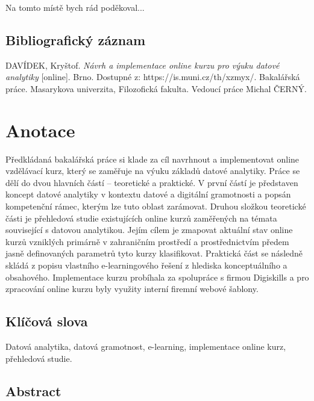 \documentclass[a4paper,12pt,openany,twoside]{book} %
\begin{document}
\par
\par\vspace*{\fill}

Na tomto místě bych rád poděkoval...

\clearpage

\subsection*{Bibliografický záznam}

DAVÍDEK, Kryštof. \textit{Návrh a implementace online kurzu pro výuku datové analytiky} [online]. Brno. Dostupné z: https://is.muni.cz/th/xzmyx/. Bakalářská práce. Masarykova univerzita, Filozofická fakulta. Vedoucí práce Michal ČERNÝ.

\section*{Anotace}

Předkládaná bakalářská práce si klade za cíl navrhnout a implementovat online vzdělávací kurz, který se zaměřuje na výuku základů datové analytiky. Práce se dělí do dvou hlavních částí – teoretické a praktické. V první částí je představen koncept datové analytiky v kontextu datové a digitální gramotnosti a popsán kompetenční rámec, kterým lze tuto oblast zarámovat. Druhou složkou teoretické části je přehledová studie existujících online kurzů zaměřených na témata související s datovou analytikou. Jejím cílem je zmapovat aktuální stav online kurzů vzniklých primárně v zahraničním prostředí a prostřednictvím předem jasně definovaných parametrů tyto kurzy klasifikovat. Praktická část se následně skládá z popisu vlastního e-learningového řešení z hlediska konceptuálního a obsahového. Implementace kurzu probíhala za spolupráce s firmou Digiskills a pro zpracování online kurzu byly využity interní firemní webové šablony.

\subsection*{Klíčová slova}
 
Datová analytika, datová gramotnost, e-learning, implementace online kurz, přehledová studie.

\subsection*{Abstract}
\end{document}
